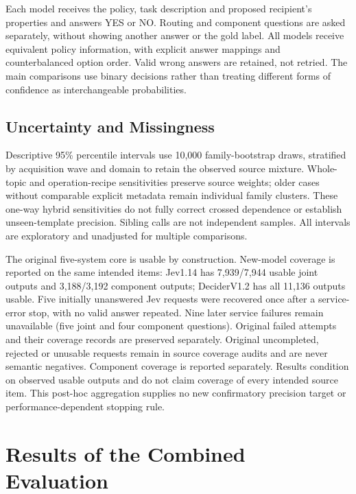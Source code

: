 \documentclass[conference]{IEEEtran}
\begin{document}
Each model receives the policy, task description and proposed recipient's
properties and answers YES or NO. Routing and component questions are asked
separately, without showing another answer or the gold label. All models receive
equivalent policy information, with explicit answer mappings and counterbalanced
option order. Valid wrong answers are retained, not retried. The main comparisons
use binary decisions rather than treating different forms of confidence as
interchangeable probabilities.

\subsection{Uncertainty and Missingness}
Descriptive 95\% percentile intervals use 10,000 family-bootstrap draws,
stratified by acquisition wave and domain to retain the observed source mixture.
Whole-topic and operation-recipe sensitivities preserve source weights; older
cases without comparable explicit metadata remain individual family clusters.
These one-way hybrid sensitivities do not fully correct crossed dependence or
establish unseen-template precision. Sibling calls are not independent samples.
All intervals are exploratory and unadjusted for multiple comparisons.

The original five-system core is usable by construction. New-model coverage is
reported on the same intended items: Jev1.14 has 7,939/7,944 usable joint outputs
and 3,188/3,192 component outputs; DeciderV1.2 has all 11,136 outputs usable.
Five initially unanswered Jev requests were recovered once after a service-error
stop, with no valid answer repeated. Nine later service failures remain
unavailable (five joint and four component questions). Original failed attempts
and their coverage records are preserved separately. Original uncompleted,
rejected or unusable requests remain in source coverage audits and are never
semantic negatives. Component coverage is reported separately. Results condition
on observed usable outputs and do not claim coverage of every intended
source item. This post-hoc aggregation supplies no new confirmatory precision
target or performance-dependent stopping rule.

\section{Results of the Combined Evaluation}
\end{document}
